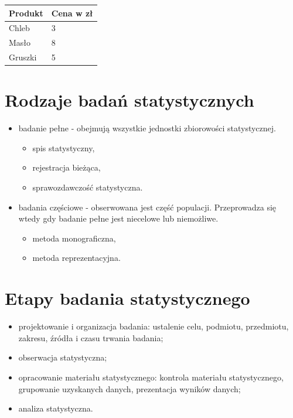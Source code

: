 \documentclass[
  letterpaper,
  DIV=11,
  numbers=noendperiod]{scrreprt}
\providecommand{\tightlist}{%
  \setlength{\itemsep}{0pt}\setlength{\parskip}{0pt}}\usepackage{longtable,booktabs,array}
\begin{document}
\begin{longtable}[]{@{}ll@{}}
\toprule\noalign{}
Produkt & Cena w zł \\
\midrule\noalign{}
\endhead
\bottomrule\noalign{}
\endlastfoot
Chleb & 3 \\
Masło & 8 \\
Gruszki & 5 \\
\end{longtable}

\section{Rodzaje badań
statystycznych}\label{rodzaje-badaux144-statystycznych}

\begin{itemize}
\tightlist
\item
  badanie pełne - obejmują wszystkie jednostki zbiorowości
  statystycznej.

  \begin{itemize}
  \tightlist
  \item
    spis statystyczny,
  \item
    rejestracja bieżąca,
  \item
    sprawozdawczość statystyczna.
  \end{itemize}
\item
  badania częściowe - obserwowana jest część populacji. Przeprowadza się
  wtedy gdy badanie pełne jest niecelowe lub niemożliwe.

  \begin{itemize}
  \tightlist
  \item
    metoda monograficzna,
  \item
    metoda reprezentacyjna.
  \end{itemize}
\end{itemize}

\section{Etapy badania
statystycznego}\label{etapy-badania-statystycznego}

\begin{itemize}
\tightlist
\item
  projektowanie i organizacja badania: ustalenie celu, podmiotu,
  przedmiotu, zakresu, źródła i czasu trwania badania;
\item
  obserwacja statystyczna;
\item
  opracowanie materiału statystycznego: kontrola materiału
  statystycznego, grupowanie uzyskanych danych, prezentacja wyników
  danych;
\item
  analiza statystyczna.
\end{itemize}
\end{document}
